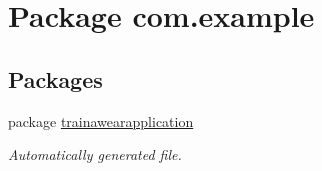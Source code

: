 \hypertarget{namespacecom_1_1example}{}\section{Package com.\+example}
\label{namespacecom_1_1example}
\subsection*{Packages}
\begin{DoxyCompactItemize}
\item 
package \mbox{\hyperlink{namespacecom_1_1example_1_1trainawearapplication}{trainawearapplication}}
\begin{DoxyCompactList}\small\item\em Automatically generated file. \end{DoxyCompactList}\end{DoxyCompactItemize}
